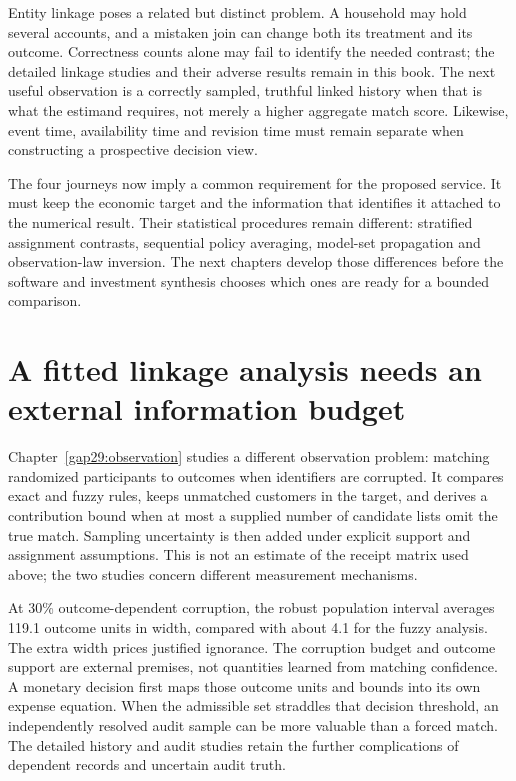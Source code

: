 Entity linkage poses a related but distinct problem. A household may hold
several accounts, and a mistaken join can change both its treatment and its
outcome. Correctness counts alone may fail to identify the needed contrast;
the detailed linkage studies and their adverse results remain in this book.
The next useful observation is a correctly sampled, truthful linked history
when that is what the estimand requires, not merely a higher aggregate match
score. Likewise, event time, availability time and revision time must remain
separate when constructing a prospective decision view.

The four journeys now imply a common requirement for the proposed service.
It must keep the economic target and the information that identifies it
attached to the numerical result. Their statistical procedures remain
different: stratified assignment contrasts, sequential policy averaging,
model-set propagation and observation-law inversion. The next chapters
develop those differences before the software and investment synthesis chooses
which ones are ready for a bounded comparison.

\section{A fitted linkage analysis needs an external information budget}
Chapter~\ref{gap29:observation} studies a different observation problem:
matching randomized participants to outcomes when identifiers are corrupted.
It compares exact and fuzzy rules, keeps unmatched customers in the target,
and derives a contribution bound when at most a supplied number of candidate
lists omit the true match. Sampling uncertainty is then added under explicit
support and assignment assumptions. This is not an estimate of the receipt
matrix used above; the two studies concern different measurement mechanisms.

At 30\% outcome-dependent corruption, the robust population interval averages
119.1 outcome units in width, compared with about 4.1 for the fuzzy analysis.
The extra width prices justified ignorance. The corruption budget and outcome
support are external premises, not quantities learned from matching confidence.
A monetary decision first maps those outcome units and bounds into its own
expense equation. When the admissible set straddles that decision threshold,
an independently resolved audit sample can be more valuable than a forced
match. The detailed history and audit studies retain the further complications
of dependent records and uncertain audit truth.

